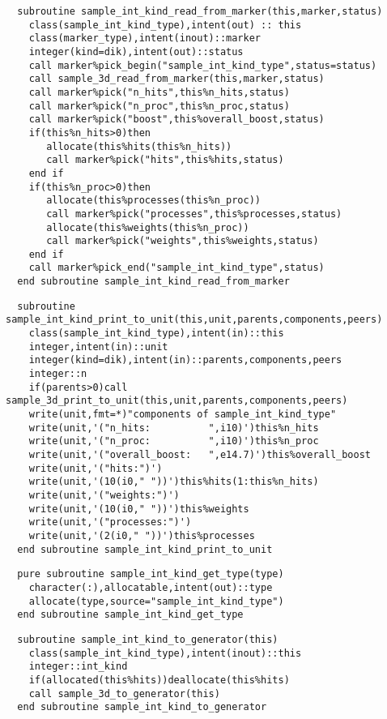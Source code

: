 \begin{Verbatim}
  subroutine sample_int_kind_read_from_marker(this,marker,status)
    class(sample_int_kind_type),intent(out) :: this
    class(marker_type),intent(inout)::marker
    integer(kind=dik),intent(out)::status  
    call marker%pick_begin("sample_int_kind_type",status=status)
    call sample_3d_read_from_marker(this,marker,status)
    call marker%pick("n_hits",this%n_hits,status)
    call marker%pick("n_proc",this%n_proc,status)
    call marker%pick("boost",this%overall_boost,status)
    if(this%n_hits>0)then
       allocate(this%hits(this%n_hits))
       call marker%pick("hits",this%hits,status)
    end if
    if(this%n_proc>0)then
       allocate(this%processes(this%n_proc))
       call marker%pick("processes",this%processes,status)
       allocate(this%weights(this%n_proc))
       call marker%pick("weights",this%weights,status)
    end if
    call marker%pick_end("sample_int_kind_type",status)
  end subroutine sample_int_kind_read_from_marker
\end{Verbatim}

\begin{Verbatim}
  subroutine sample_int_kind_print_to_unit(this,unit,parents,components,peers)
    class(sample_int_kind_type),intent(in)::this
    integer,intent(in)::unit
    integer(kind=dik),intent(in)::parents,components,peers
    integer::n
    if(parents>0)call sample_3d_print_to_unit(this,unit,parents,components,peers)
    write(unit,fmt=*)"components of sample_int_kind_type"
    write(unit,'("n_hits:          ",i10)')this%n_hits
    write(unit,'("n_proc:          ",i10)')this%n_proc
    write(unit,'("overall_boost:   ",e14.7)')this%overall_boost
    write(unit,'("hits:")')
    write(unit,'(10(i0," "))')this%hits(1:this%n_hits)
    write(unit,'("weights:")')
    write(unit,'(10(i0," "))')this%weights
    write(unit,'("processes:")')
    write(unit,'(2(i0," "))')this%processes
  end subroutine sample_int_kind_print_to_unit
\end{Verbatim}
 
\begin{Verbatim}
  pure subroutine sample_int_kind_get_type(type)
    character(:),allocatable,intent(out)::type
    allocate(type,source="sample_int_kind_type")
  end subroutine sample_int_kind_get_type
\end{Verbatim}

\begin{Verbatim}
  subroutine sample_int_kind_to_generator(this)
    class(sample_int_kind_type),intent(inout)::this
    integer::int_kind
    if(allocated(this%hits))deallocate(this%hits)
    call sample_3d_to_generator(this)
  end subroutine sample_int_kind_to_generator
\end{Verbatim}


